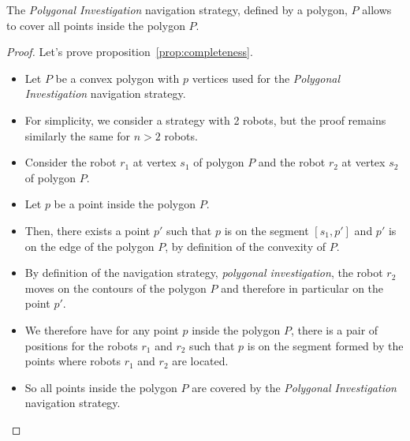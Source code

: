 \begin{proposition}
	The \textit{Polygonal Investigation} navigation strategy, defined by a polygon, $P$ allows to cover all points inside the polygon $P$.
	\label{prop:completeness}
\end{proposition}
\begin{proof}
	Let's prove proposition~\ref{prop:completeness}.
	\begin{itemize}
		\item Let $P$ be a convex polygon with $p$ vertices used for the \textit{Polygonal Investigation} navigation strategy.
		\item For simplicity, we consider a strategy with 2 robots, but the proof remains similarly the same for $n > 2$ robots.
		\item Consider the robot $r_1$ at vertex $s_1$ of polygon $P$ and the robot $r_2$ at vertex $s_2$ of polygon $P$.
		\item Let $p$ be a point inside the polygon $P$.
		\item Then, there exists a point $p'$ such that $p$ is on the segment $[s_1, p']$ and $p'$ is on the edge of the polygon $P$, by definition of the convexity of $P$.
		\item By definition of the navigation strategy, \textit{polygonal investigation}, the robot $r_2$ moves on the contours of the polygon $P$ and therefore in particular on the point $p'$.
		\item We therefore have for any point $p$ inside the polygon $P$, there is a pair of positions for the robots $r_1$ and $r_2$ such that $p$ is on the segment formed by the points where robots $r_1$ and $r_2$ are located.
		\item So all points inside the polygon $P$ are covered by the \textit{Polygonal Investigation} navigation strategy.
	\end{itemize}
\end{proof}

